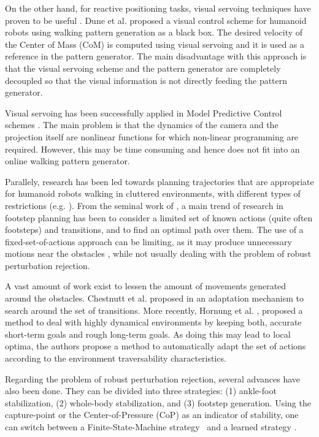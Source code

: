 On the other hand, for reactive positioning tasks, visual servoing techniques have proven to be useful \citep{ChaumetteRAM2006, ChaumetteRAM2007}. Dune et al. \citep{DuneIROS2010} proposed a visual control scheme for humanoid robots using walking pattern generation as a black box. The desired velocity of the Center of Mass (CoM) is computed using visual servoing and it is used as a reference in the pattern generator. The main disadvantage with this approach is that the visual servoing scheme and the pattern generator are completely decoupled so that the visual information is not directly feeding the pattern generator.

Visual servoing has been successfully applied in Model Predictive Control schemes \citep{Allibert2010}. The main problem is that the dynamics of the camera and the projection itself are nonlinear functions for which non-linear programming are required. However, this may be time consuming and hence does not fit into an online walking pattern generator.

Parallely, research has been led towards planning trajectories that are appropriate for humanoid robots walking in cluttered environments, with different types of restrictions (e.g. \citep{Chestnutt2005, jib-IJHR2010}). 
From the seminal work of \citep{Chestnutt2005}, a main trend of research in footstep planning has been to consider a limited set of known actions (quite often footsteps) and transitions, and to find an optimal path over them. The use of a fixed-set-of-actions approach can be limiting, as it may produce unnecessary motions near the obstacles \citep{Bourgeot:IROS:2002}, while not usually dealing with the problem of robust perturbation rejection. 

A vast amount of work exist to lessen the amount of movements generated around the obstacles. Chestnutt et al. proposed in \citep{Chestnutt:ICRA:2007} an adaptation mechanism to search around the set of transitions. More recently, Hornung et al. \citep{Hornung:ICRA:2012}, proposed a method to deal with highly dynamical environments by keeping both, accurate short-term goals and rough long-term goals. As doing this may lead to local optima, the authors propose a method to automatically adapt the set of actions according to the environment traversability characteristics. 

Regarding the problem of robust perturbation rejection, several advances have also been done. They can be divided into three strategies: (1) ankle-foot stabilization, (2) whole-body stabilization, and (3) footstep generation. 
Using the capture-point or the Center-of-Pressure (CoP) as an indicator of stability, one can switch between a Finite-State-Machine strategy~\citep{Nishiwaki:ijrr:2009} and a learned strategy \citep{SeungJoon:ichr:2011}.


